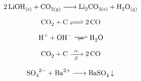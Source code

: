 \begin{equation}
\ce{2LiOH_{(s)} + CO_{2(g)} -> Li_{2}CO_{3(s)} + H_{2}O_{(g)} }
\end{equation}

\begin{equation}
\ce{CO2 + C <=> 2CO}
\end{equation}

\begin{equation}
\ce{H+ + OH- <=>> H2O}
\end{equation}

\begin{equation}
\ce{CO2 + C ->[\alpha][\beta] 2CO}
\end{equation}


\begin{equation}
\ce{SO4^2- + Ba^2+ -> BaSO4 v}
\end{equation}

